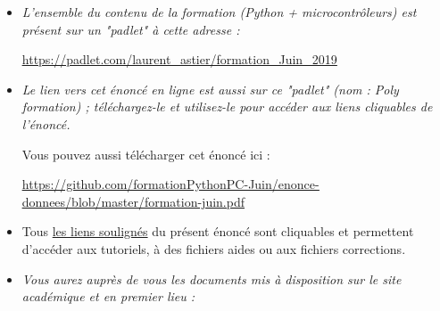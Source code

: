 \documentclass[11pt]{article}
\begin{document}
\begin{itemize}
 \item \textit{L'ensemble du contenu de la formation (Python + microcontrôleurs) est présent sur un "padlet" à cette adresse : }
 
 \smallskip
 
 \begin{center}
  \underline{\url{https://padlet.com/laurent\_astier/formation\_Juin\_2019}}
 \end{center}
 
 
 
 

 
 \bigskip
 
 
 
 
 
 

\item \textit{Le lien vers cet énoncé en ligne est aussi sur ce "padlet" (nom : Poly formation) ; téléchargez-le et utilisez-le pour accéder aux liens cliquables de l'énoncé.}

\medskip

Vous pouvez aussi télécharger cet énoncé ici : 

\smallskip

\begin{center}
\underline{\url{https://github.com/formationPythonPC-Juin/enonce-donnees/blob/master/formation-juin.pdf}                                                                                                  }
\end{center}






\bigskip








\item Tous \underline{les liens soulignés} du présent énoncé sont cliquables et permettent d'accéder aux tutoriels, à des fichiers aides ou aux fichiers corrections.






\bigskip






\item \textit{Vous aurez auprès de vous les documents mis à disposition sur le site académique et en premier lieu : }

\medskip



\end{itemize}
\end{document}
